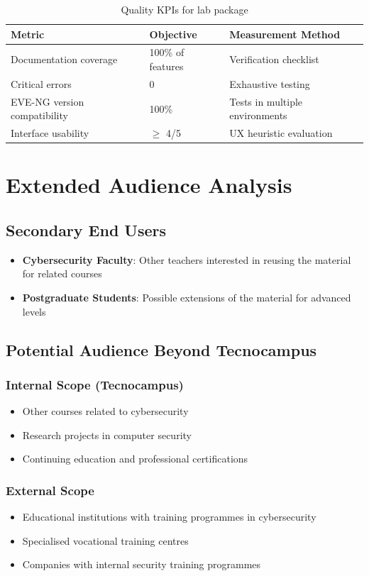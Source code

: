 \begin{table}[H]
  \centering
  \small
  \setlength{\tabcolsep}{4pt}
  \renewcommand{\arraystretch}{1.1}
  \begin{tabularx}{\textwidth}{l l X}
    \toprule
    \textbf{Metric} & \textbf{Objective} & \textbf{Measurement Method} \\
    \midrule
    Documentation coverage & 100\% of features & Verification checklist \\
    \midrule
    Critical errors & 0 & Exhaustive testing \\
    \midrule
    EVE-NG version compatibility & 100\% & Tests in multiple environments \\
    \midrule
    Interface usability & $\geq$ 4/5 & UX heuristic evaluation \\
    \bottomrule
  \end{tabularx}
  \caption{Quality KPIs for lab package}
  \label{tab:kpi_quality_detail}
\end{table}

\section{Extended Audience Analysis}

\subsection{Secondary End Users}

\begin{itemize}
\item \textbf{Cybersecurity Faculty}: Other teachers interested in reusing the material
      for related courses
\item \textbf{Postgraduate Students}: Possible extensions of the material for advanced levels
\end{itemize}

\subsection{Potential Audience Beyond Tecnocampus}

\subsubsection{Internal Scope (Tecnocampus)}

\begin{itemize}
\item Other courses related to cybersecurity
\item Research projects in computer security
\item Continuing education and professional certifications
\end{itemize}

\subsubsection{External Scope}

\begin{itemize}
\item Educational institutions with training programmes in cybersecurity
\item Specialised vocational training centres
\item Companies with internal security training programmes
\end{itemize}
